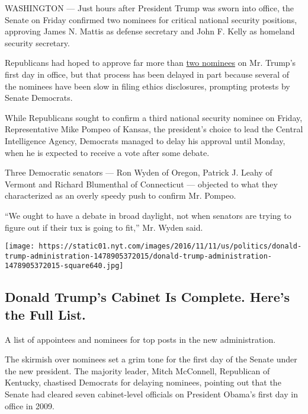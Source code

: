 WASHINGTON --- Just hours after President Trump was sworn into office,
the Senate on Friday confirmed two nominees for critical national
security positions, approving James N. Mattis as defense secretary and
John F. Kelly as homeland security secretary.

Republicans had hoped to approve far more than
\href{https://www.nytimes.com/interactive/2016/us/politics/donald-trump-administration.html}{two
nominees} on Mr. Trump's first day in office, but that process has been
delayed in part because several of the nominees have been slow in filing
ethics disclosures, prompting protests by Senate Democrats.

While Republicans sought to confirm a third national security nominee on
Friday, Representative Mike Pompeo of Kansas, the president's choice to
lead the Central Intelligence Agency, Democrats managed to delay his
approval until Monday, when he is expected to receive a vote after some
debate.

Three Democratic senators --- Ron Wyden of Oregon, Patrick J. Leahy of
Vermont and Richard Blumenthal of Connecticut --- objected to what they
characterized as an overly speedy push to confirm Mr. Pompeo.

``We ought to have a debate in broad daylight, not when senators are
trying to figure out if their tux is going to fit,'' Mr. Wyden said.

\href{https://www.nytimes.com/interactive/2016/us/politics/donald-trump-administration.html}{}

\texttt{[image: https://static01.nyt.com/images/2016/11/11/us/politics/donald-trump-administration-1478905372015/donald-trump-administration-1478905372015-square640.jpg]}

\hypertarget{donald-trumps-cabinet-is-complete-heres-the-full-list}{%
\subsection{Donald Trump's Cabinet Is Complete. Here's the Full
List.}\label{donald-trumps-cabinet-is-complete-heres-the-full-list}}

A list of appointees and nominees for top posts in the new
administration.

The skirmish over nominees set a grim tone for the first day of the
Senate under the new president. The majority leader, Mitch McConnell,
Republican of Kentucky, chastised Democrats for delaying nominees,
pointing out that the Senate had cleared seven cabinet-level officials
on President Obama's first day in office in 2009.

